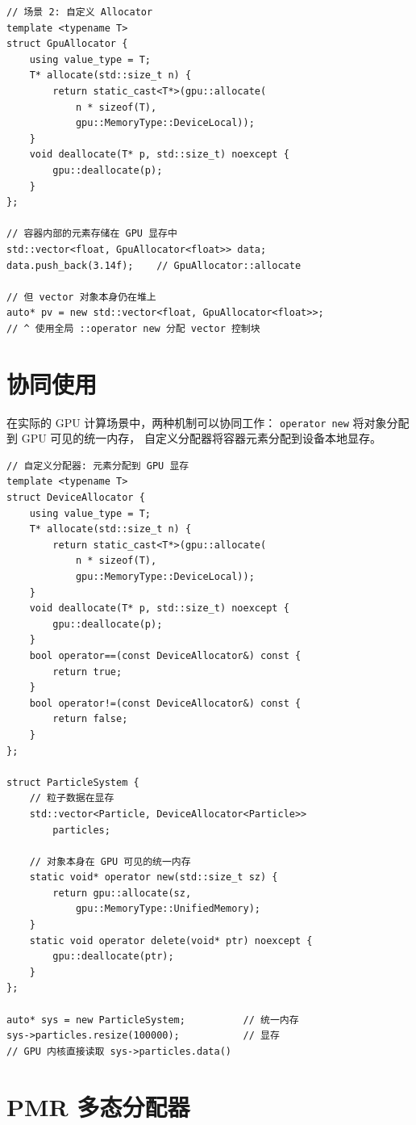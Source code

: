 \documentclass[12pt,a4paper,fontset=fandol]{ctexbook}
\begin{document}
\begin{lstlisting}
// 场景 2: 自定义 Allocator
template <typename T>
struct GpuAllocator {
    using value_type = T;
    T* allocate(std::size_t n) {
        return static_cast<T*>(gpu::allocate(
            n * sizeof(T),
            gpu::MemoryType::DeviceLocal));
    }
    void deallocate(T* p, std::size_t) noexcept {
        gpu::deallocate(p);
    }
};

// 容器内部的元素存储在 GPU 显存中
std::vector<float, GpuAllocator<float>> data;
data.push_back(3.14f);    // GpuAllocator::allocate

// 但 vector 对象本身仍在堆上
auto* pv = new std::vector<float, GpuAllocator<float>>;
// ^ 使用全局 ::operator new 分配 vector 控制块
\end{lstlisting}

\section{协同使用}

在实际的 GPU 计算场景中，两种机制可以协同工作：
\texttt{operator new} 将对象分配到 GPU 可见的统一内存，
自定义分配器将容器元素分配到设备本地显存。

\begin{lstlisting}
// 自定义分配器: 元素分配到 GPU 显存
template <typename T>
struct DeviceAllocator {
    using value_type = T;
    T* allocate(std::size_t n) {
        return static_cast<T*>(gpu::allocate(
            n * sizeof(T),
            gpu::MemoryType::DeviceLocal));
    }
    void deallocate(T* p, std::size_t) noexcept {
        gpu::deallocate(p);
    }
    bool operator==(const DeviceAllocator&) const {
        return true;
    }
    bool operator!=(const DeviceAllocator&) const {
        return false;
    }
};

struct ParticleSystem {
    // 粒子数据在显存
    std::vector<Particle, DeviceAllocator<Particle>>
        particles;

    // 对象本身在 GPU 可见的统一内存
    static void* operator new(std::size_t sz) {
        return gpu::allocate(sz,
            gpu::MemoryType::UnifiedMemory);
    }
    static void operator delete(void* ptr) noexcept {
        gpu::deallocate(ptr);
    }
};

auto* sys = new ParticleSystem;          // 统一内存
sys->particles.resize(100000);           // 显存
// GPU 内核直接读取 sys->particles.data()
\end{lstlisting}

\section{PMR 多态分配器}
\end{document}
